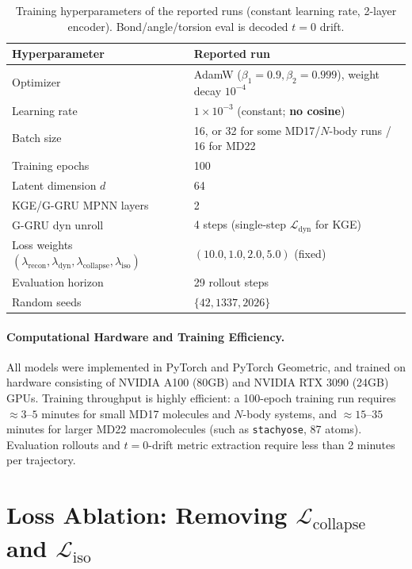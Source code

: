 \documentclass{article}
\newcommand{\GKE}{\textsc{KGE}}
\newcommand{\GGRU}{\textsc{G-GRU}}
\begin{document}
\begin{table}[htbp]
\centering
\caption{Training hyperparameters of the reported runs (constant learning rate, 2-layer encoder). Bond/angle/torsion eval is decoded $t=0$ drift.}
\label{tab:hyperparams_summary}
\begin{tabular}{ll}
  \toprule
  Hyperparameter & Reported run \\
  \midrule
  Optimizer & AdamW ($\beta_1=0.9, \beta_2=0.999$), weight decay $10^{-4}$ \\
  Learning rate & $1\times 10^{-3}$ (constant; \textbf{no cosine}) \\
  Batch size & 16, or 32 for some MD17/$N$-body runs / 16 for MD22 \\
  Training epochs & 100 \\
  Latent dimension $d$ & 64 \\
  \GKE{}/\GGRU{} MPNN layers & 2 \\
  \GGRU{} dyn unroll & 4 steps (single-step $\mathcal{L}_{\text{dyn}}$ for \GKE{}) \\
  Loss weights $(\lambda_{\text{recon}}, \lambda_{\text{dyn}}, \lambda_{\text{collapse}}, \lambda_{\text{iso}})$ & $(10.0, 1.0, 2.0, 5.0)$ (fixed) \\
  Evaluation horizon & 29 rollout steps \\
  Random seeds & $\{42, 1337, 2026\}$ \\
  \bottomrule
\end{tabular}
\end{table}

\paragraph{Computational Hardware and Training Efficiency.}
All models were implemented in PyTorch and PyTorch Geometric, and trained on hardware consisting of NVIDIA A100 (80GB) and NVIDIA RTX 3090 (24GB) GPUs. Training throughput is highly efficient: a 100-epoch training run requires $\approx 3\text{--}5$ minutes for small MD17 molecules and $N$-body systems, and $\approx 15\text{--}35$ minutes for larger MD22 macromolecules (such as \texttt{stachyose}, 87 atoms). Evaluation rollouts and $t=0$-drift metric extraction require less than 2 minutes per trajectory.

\section{Loss Ablation: Removing $\mathcal{L}_{\text{collapse}}$ and $\mathcal{L}_{\text{iso}}$}
\label{app:loss_ablation}
\end{document}
